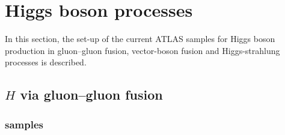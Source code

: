 \section{Higgs boson processes}

In this section, the set-up of the current ATLAS samples for Higgs boson production in gluon--gluon fusion, 
vector-boson fusion and Higgs-strahlung processes is described.

\subsection{$H$ via gluon--gluon fusion}

\subsubsection*{\texorpdfstring{\POWPY[8]}{Powheg+Pythia8} samples}


